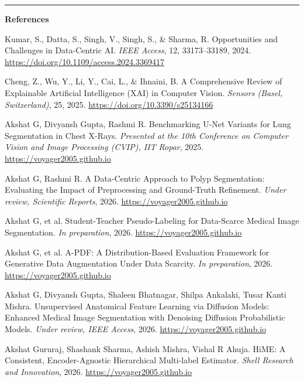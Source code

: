 \documentclass[11pt]{article}
\begin{document}
\vspace{4pt}
\hrule
\vspace{4pt}

{\footnotesize
\textbf{References}
\begin{enumerate}[leftmargin=1.3em, itemsep=1pt, label={[\arabic*]}]
\item \label{ref1} Kumar, S., Datta, S., Singh, V., Singh, S., \& Sharma, R. Opportunities and Challenges in Data-Centric AI. \emph{IEEE Access}, 12, 33173--33189, 2024. \url{https://doi.org/10.1109/access.2024.3369417}
\item \label{ref2} Cheng, Z., Wu, Y., Li, Y., Cai, L., \& Ihnaini, B. A Comprehensive Review of Explainable Artificial Intelligence (XAI) in Computer Vision. \emph{Sensors (Basel, Switzerland)}, 25, 2025. \url{https://doi.org/10.3390/s25134166}
\item \label{ref3} Akshat G, Divyansh Gupta, Rashmi R. Benchmarking U-Net Variants for Lung Segmentation in Chest X-Rays. \emph{Presented at the 10th Conference on Computer Vision and Image Processing (CVIP), IIT Ropar}, 2025. \url{https://voyager2005.github.io}
\item \label{ref4} Akshat G, Rashmi R. A Data-Centric Approach to Polyp Segmentation: Evaluating the Impact of Preprocessing and Ground-Truth Refinement. \emph{Under review, Scientific Reports}, 2026. \url{https://voyager2005.github.io}
\item \label{ref5} Akshat G, et al. Student-Teacher Pseudo-Labeling for Data-Scarce Medical Image Segmentation. \emph{In preparation}, 2026. \url{https://voyager2005.github.io}
\item \label{ref6} Akshat G, et al. A-PDF: A Distribution-Based Evaluation Framework for Generative Data Augmentation Under Data Scarcity. \emph{In preparation}, 2026. \url{https://voyager2005.github.io}
\item \label{ref7} Akshat G, Divyansh Gupta, Shaleen Bhatnagar, Shilpa Ankalaki, Tusar Kanti Mishra. Unsupervised Anatomical Feature Learning via Diffusion Models: Enhanced Medical Image Segmentation with Denoising Diffusion Probabilistic Models. \emph{Under review, IEEE Access}, 2026. \url{https://voyager2005.github.io}
\item \label{ref8} Akshat Gururaj, Shashank Sharma, Ashish Mishra, Vishal R Ahuja. HiME: A Consistent, Encoder-Agnostic Hierarchical Multi-label Estimator. \emph{Shell Research and Innovation}, 2026. \url{https://voyager2005.github.io}
\end{enumerate}
}
\end{document}
